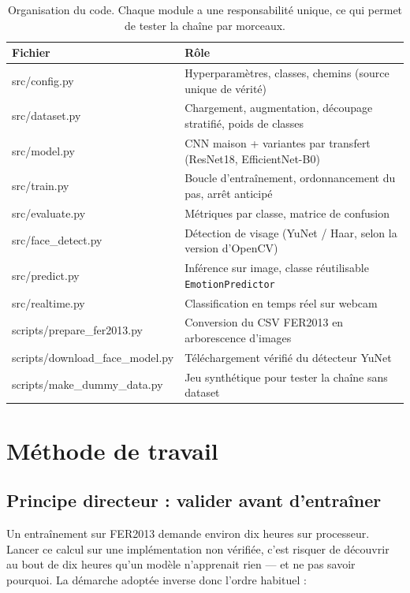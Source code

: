 \documentclass[11pt,a4paper]{article}
\newcommand{\code}[1]{\texttt{\small #1}}
\begin{document}
\begin{table}[h]
\centering
\small
\begin{tabularx}{\textwidth}{>{\ttfamily}l X}
\toprule
\textrm{\textbf{Fichier}} & \textbf{Rôle} \\
\midrule
src/config.py      & Hyperparamètres, classes, chemins (source unique de vérité) \\
src/dataset.py     & Chargement, augmentation, découpage stratifié, poids de classes \\
src/model.py       & CNN maison + variantes par transfert (ResNet18, EfficientNet-B0) \\
src/train.py       & Boucle d'entraînement, ordonnancement du pas, arrêt anticipé \\
src/evaluate.py    & Métriques par classe, matrice de confusion \\
src/face\_detect.py & Détection de visage (YuNet / Haar, selon la version d'OpenCV) \\
src/predict.py     & Inférence sur image, classe réutilisable \code{EmotionPredictor} \\
src/realtime.py    & Classification en temps réel sur webcam \\
\midrule
scripts/prepare\_fer2013.py   & Conversion du CSV FER2013 en arborescence d'images \\
scripts/download\_face\_model.py & Téléchargement vérifié du détecteur YuNet \\
scripts/make\_dummy\_data.py   & Jeu synthétique pour tester la chaîne sans dataset \\
\bottomrule
\end{tabularx}
\caption{Organisation du code. Chaque module a une responsabilité unique, ce qui
permet de tester la chaîne par morceaux.}
\end{table}

\section{Méthode de travail}

\subsection{Principe directeur : valider avant d'entraîner}

Un entraînement sur FER2013 demande environ dix heures sur processeur. Lancer ce
calcul sur une implémentation non vérifiée, c'est risquer de découvrir au bout
de dix heures qu'un modèle n'apprenait rien --- et ne pas savoir pourquoi. La
démarche adoptée inverse donc l'ordre habituel :
\end{document}
